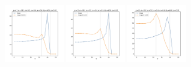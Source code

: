 \documentclass[a4paper]{article}
\begin{document}
\begin{figure}[H]
  \includegraphics[width=0.23\textwidth]{grid-g6-v6-w2_0}
  \includegraphics[width=0.23\textwidth]{grid-g6-v6-w3_0}
  \includegraphics[width=0.23\textwidth]{grid-g6-v6-w4_0}
\end{figure}
\end{document}
